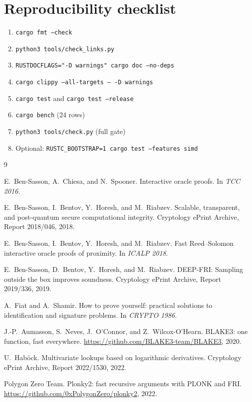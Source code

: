 \documentclass[11pt,a4paper]{article}
\begin{document}
\section{Reproducibility checklist}

\begin{enumerate}[leftmargin=1.3em]
\item \texttt{cargo fmt --check}
\item \texttt{python3 tools/check\_links.py}
\item \texttt{RUSTDOCFLAGS="-D warnings" cargo doc --no-deps}
\item \texttt{cargo clippy --all-targets -- -D warnings}
\item \texttt{cargo test} and \texttt{cargo test --release}
\item \texttt{cargo bench} (24 rows)
\item \texttt{python3 tools/check.py} (full gate)
\item Optional: \texttt{RUSTC\_BOOTSTRAP=1 cargo test --features simd}
\end{enumerate}


\begin{thebibliography}{9}

E.~Ben-Sasson, A.~Chiesa, and N.~Spooner.
\newblock Interactive oracle proofs.
\newblock In {\em TCC 2016}.

E.~Ben-Sasson, I.~Bentov, Y.~Horesh, and M.~Riabzev.
\newblock Scalable, transparent, and post-quantum secure computational integrity.
\newblock Cryptology ePrint Archive, Report 2018/046, 2018.

E.~Ben-Sasson, I.~Bentov, Y.~Horesh, and M.~Riabzev.
\newblock Fast Reed--Solomon interactive oracle proofs of proximity.
\newblock In {\em ICALP 2018}.

E.~Ben-Sasson, D.~Bentov, Y.~Horesh, and M.~Riabzev.
\newblock DEEP-FRI: Sampling outside the box improves soundness.
\newblock Cryptology ePrint Archive, Report 2019/336, 2019.

A.~Fiat and A.~Shamir.
\newblock How to prove yourself: practical solutions to identification and
  signature problems.
\newblock In {\em CRYPTO 1986}.

J.-P.~Aumasson, S.~Neves, J.~O'Connor, and Z.~Wilcox-O'Hearn.
\newblock BLAKE3: one function, fast everywhere.
\newblock \url{https://github.com/BLAKE3-team/BLAKE3}, 2020.

U.~Hab\"ock.
\newblock Multivariate lookups based on logarithmic derivatives.
\newblock Cryptology ePrint Archive, Report 2022/1530, 2022.

Polygon Zero Team.
\newblock Plonky2: fast recursive arguments with PLONK and FRI.
\newblock \url{https://github.com/0xPolygonZero/plonky2}, 2022.

\end{thebibliography}
\end{document}
